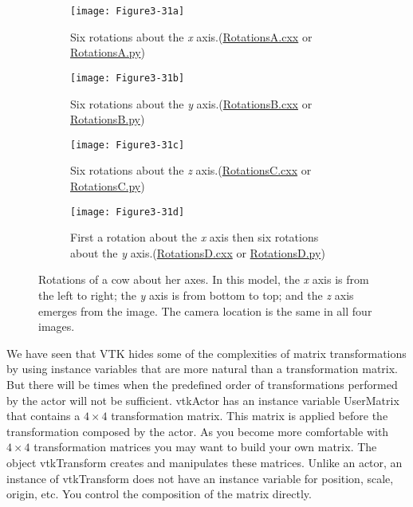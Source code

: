 \begin{figure}[!htb]
\begin{subfigure}[h]{0.48\linewidth}
\texttt{[image: Figure3-31a]}
\caption{Six rotations about the \emph{x} axis.(\href{https://lorensen.github.io/VTKExamples/site/Cxx/Rendering/RotationsA/}{RotationsA.cxx} or \href{https://lorensen.github.io/VTKExamples/site/Python/Rendering/RotationsA/}{RotationsA.py})}\label{fig:Figure3-31a}
\end{subfigure}
\hfill
\begin{subfigure}[h]{0.48\linewidth}
\texttt{[image: Figure3-31b]}
\caption{Six rotations about the \emph{y} axis.(\href{https://lorensen.github.io/VTKExamples/site/Cxx/Rendering/RotationsB/}{RotationsB.cxx} or \href{https://lorensen.github.io/VTKExamples/site/Python/Rendering/RotationsB/}{RotationsB.py})}\label{fig:Figure3-31b}
\end{subfigure}
\hfill
\begin{subfigure}[h]{0.48\linewidth}
\texttt{[image: Figure3-31c]}
\caption{Six rotations about the \emph{z} axis.(\href{https://lorensen.github.io/VTKExamples/site/Cxx/Rendering/RotationsC/}{RotationsC.cxx} or \href{https://lorensen.github.io/VTKExamples/site/Python/Rendering/RotationsC/}{RotationsC.py})}\label{fig:Figure3-31c}
\end{subfigure}
\hfill
\begin{subfigure}[h]{0.48\linewidth}
\texttt{[image: Figure3-31d]}
\caption{First a rotation about the \emph{x} axis then six rotations about the \emph{y} axis.(\href{https://lorensen.github.io/VTKExamples/site/Cxx/Rendering/RotationsD/}{RotationsD.cxx} or \href{https://lorensen.github.io/VTKExamples/site/Python/Rendering/RotationsD/}{RotationsD.py})}\label{fig:Figure3-31d}
\end{subfigure}%
\caption{Rotations of a cow about her axes. In this model, the \emph{x} axis is from the left to right; the \emph{y} axis is from bottom to top; and the \emph{z} axis emerges from the image. The camera location is the same in all four images.}\label{fig:Figure3-31}
\end{figure}


We have seen that VTK hides some of the complexities of matrix transformations by using instance variables that are more natural than a transformation matrix. But there will be times when the predefined order of transformations performed by the actor will not be sufficient. vtkActor has an instance variable UserMatrix that contains a $4 \times 4$ transformation matrix. This matrix is applied before the transformation composed by the actor. As you become more comfortable with $4 \times 4$ transformation matrices you may want to build your own matrix. The object vtkTransform creates and manipulates these matrices. Unlike an actor, an instance of vtkTransform does not have an instance variable for position, scale, origin, etc. You control the composition of the matrix directly.

